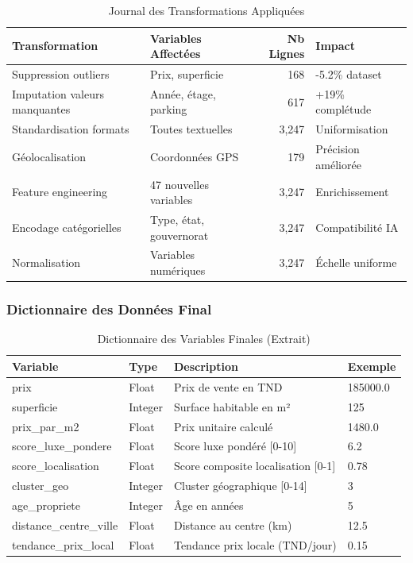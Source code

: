 \begin{table}[H]
\centering
\caption{Journal des Transformations Appliquées}
\begin{tabular}{|l|l|r|l|}
\hline
\textbf{Transformation} & \textbf{Variables Affectées} & \textbf{Nb Lignes} & \textbf{Impact} \\
\hline
Suppression outliers & Prix, superficie & 168 & -5.2\% dataset \\
\hline
Imputation valeurs manquantes & Année, étage, parking & 617 & +19\% complétude \\
\hline
Standardisation formats & Toutes textuelles & 3,247 & Uniformisation \\
\hline
Géolocalisation & Coordonnées GPS & 179 & Précision améliorée \\
\hline
Feature engineering & 47 nouvelles variables & 3,247 & Enrichissement \\
\hline
Encodage catégorielles & Type, état, gouvernorat & 3,247 & Compatibilité IA \\
\hline
Normalisation & Variables numériques & 3,247 & Échelle uniforme \\
\hline
\end{tabular}
\label{tab:journal_transformations}
\end{table}

\subsubsection{Dictionnaire des Données Final}

\begin{table}[H]
\centering
\caption{Dictionnaire des Variables Finales (Extrait)}
\begin{tabular}{|l|l|l|l|}
\hline
\textbf{Variable} & \textbf{Type} & \textbf{Description} & \textbf{Exemple} \\
\hline
prix & Float & Prix de vente en TND & 185000.0 \\
\hline
superficie & Integer & Surface habitable en m² & 125 \\
\hline
prix\_par\_m2 & Float & Prix unitaire calculé & 1480.0 \\
\hline
score\_luxe\_pondere & Float & Score luxe pondéré [0-10] & 6.2 \\
\hline
score\_localisation & Float & Score composite localisation [0-1] & 0.78 \\
\hline
cluster\_geo & Integer & Cluster géographique [0-14] & 3 \\
\hline
age\_propriete & Integer & Âge en années & 5 \\
\hline
distance\_centre\_ville & Float & Distance au centre (km) & 12.5 \\
\hline
tendance\_prix\_local & Float & Tendance prix locale (TND/jour) & 0.15 \\
\hline
\end{tabular}
\label{tab:dictionnaire_variables}
\end{table}

